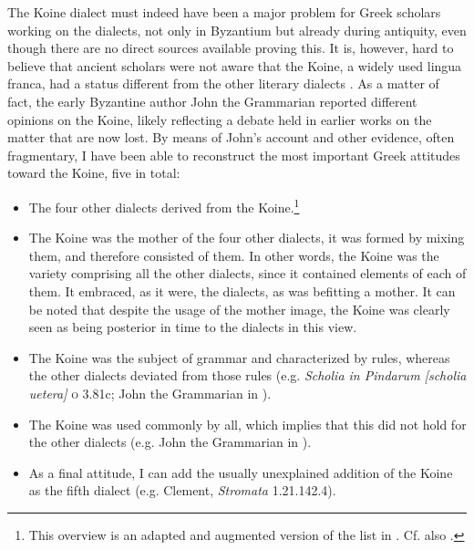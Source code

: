 The Koine dialect must indeed have been a major problem for Greek scholars working on the dialects, not only in Byzantium but already during antiquity, even though there are no direct sources available proving this. It is, however, hard to believe that ancient scholars were not aware that the Koine, a widely used lingua franca, had a status different from the other literary dialects \citep{Consani2000}. As a matter of fact, the early Byzantine author John the Grammarian reported different opinions on the Koine, likely reflecting a debate held in earlier works on the matter that are now lost. By means of John’s account and other evidence, often fragmentary, I have been able to reconstruct the most important Greek attitudes toward the Koine, five in total:

\begin{itemize}
\item 
The four other dialects derived from the Koine.\footnote{This overview is an adapted and augmented version of the list in \citet[209]{VanRooy2016b}. Cf. also \citet[614--617]{Consani2000}.}

\item 
The Koine was the mother of the four other dialects, it was formed by mixing them, and therefore consisted of them. In other words, the Koine was the variety comprising all the other dialects, since it contained elements of each of them. It embraced, as it were, the dialects, as was befitting a mother. It can be noted that despite the usage of the mother image, the Koine was clearly seen as being posterior in time to the dialects in this view.

\item 
The Koine was the subject of grammar and characterized by rules, whereas the other dialects deviated from those rules (e.g. \textit{Scholia in Pindarum [scholia uetera]} \textsc{o} 3.81c; John the Grammarian in \citealt[236\textsc{\textsuperscript{v}}]{Manutius1496Thesaurus}).

\item 
The Koine was used commonly by all, which implies that this did not hold for the other dialects (e.g. John the Grammarian in \citealt[236\textsc{\textsuperscript{v}}]{Manutius1496Thesaurus}).

\item 
As a final attitude, I can add the usually unexplained addition of the Koine as the fifth dialect (e.g. Clement, \textit{Stromata} 1.21.142.4).
\end{itemize}

